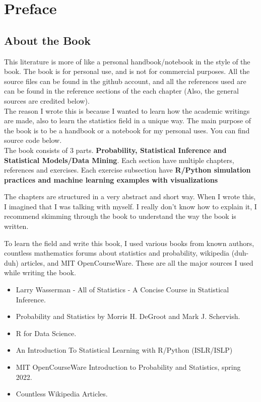 \chapter*{Preface}

\section*{About the Book}
This literature is more of like a personal handbook/notebook in the style of the book. The book is for personal use, and is not for commercial purposes. All the source files can be found in the github account, and all the references used are can be found in the reference sections of the each chapter (Also, the general sources are credited below).\\
The reason I wrote this is because I wanted to learn how the academic writings are made, also to learn the statistics field in a unique way. The main purpose of the book is to be a handbook or a notebook for my personal uses. You can find source code below.\\
The book consists of $3$ parts. \textbf{Probability, Statistical Inference and Statistical Models/Data Mining}. Each section have multiple chapters, references and exercises. Each exercise subsection have \textbf{R/Python simulation practices and machine learning examples with visualizations}
\par
The chapters are structured in a very abstract and short way. When I wrote this, I imagined that I was talking with myself. I really don't know how to explain it, I recommend skimming through the book to understand the way the book is written.
\par
To learn the field and write this book, I used various books from known authors, countless mathematics forums about statistics and probability, wikipedia (duh-duh) articles, and MIT OpenCourseWare. These are all the major sources I used while writing the book.
\begin{itemize}
    \item Larry Wasserman - All of Statistics - A Concise Course in Statistical Inference.
    \item Probability and Statistics by Morris H. DeGroot and Mark J. Schervish.
    \item R for Data Science.
    \item An Introduction To Statistical Learning with R/Python (ISLR/ISLP)
    \item MIT OpenCourseWare Introduction to Probability and Statistics, spring 2022.
    \item Countless Wikipedia Articles.
\end{itemize}

